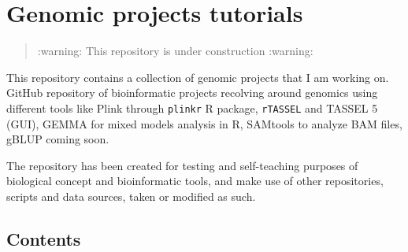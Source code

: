\hypertarget{genomic-projects-tutorials}{%
\section{Genomic projects tutorials}\label{genomic-projects-tutorials}}

\begin{quote}
:warning: This repository is under construction :warning:
\end{quote}

This repository contains a collection of genomic projects that I am
working on. GitHub repository of bioinformatic projects recolving around
genomics using different tools like Plink through \texttt{plinkr} R
package, \texttt{rTASSEL} and TASSEL 5 (GUI), GEMMA for mixed models
analysis in R, SAMtools to analyze BAM files, gBLUP coming soon.

The repository has been created for testing and self-teaching purposes
of biological concept and bioinformatic tools, and make use of other
repositories, scripts and data sources, taken or modified as such.

\hypertarget{contents}{%
\subsection{Contents}\label{contents}}

